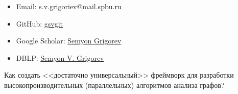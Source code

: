 \documentclass[xcolor=table,aspectratio=169]{beamer}
\begin{document}
\begin{frame}[fragile]
\begin{minipage}[t]{0.29\textwidth}
\begin{center}
  \end{center}
  {\scriptsize
\begin{itemize}    
  \item Email: s.v.grigoriev@mail.spbu.ru
  \item GitHub: \href{https://github.com/gsvgit}{gsvgit}
  \item Google Scholar: \href{https://scholar.google.com/citations?hl=ru&user=kP4dqUAAAAAJ&view_op=list_works&sortby=pubdate}{Semyon Grigorev}
  \item DBLP: \href{https://dblp.org/pid/181/9903.html}{Semyon V. Grigorev}
\end{itemize}
  }
\end{minipage}
\end{frame}

\begin{frame}[fragile]
  \begin{center}\huge
    Как создать <<достаточно универсальный>> фреймворк для разработки высокопроизводительных (параллельных) алгоритмов анализа графов?
  \end{center}
\end{frame}
\end{document}
